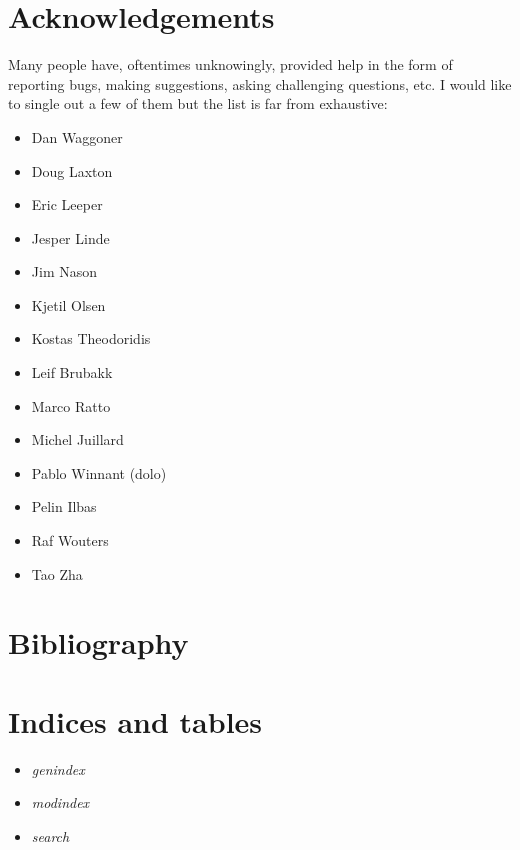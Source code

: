 \documentclass[letterpaper,10pt,english]{sphinxmanual}
\begin{document}
\chapter{Acknowledgements}
\label{acknowledgements:acknowledgements}\label{acknowledgements::doc}
Many people have, oftentimes unknowingly, provided help in the form of reporting bugs, making suggestions, asking challenging questions, etc.
I would like to single out a few of them but the list is far from exhaustive:
\begin{itemize}
\item {} 
Dan Waggoner

\item {} 
Doug Laxton

\item {} 
Eric Leeper

\item {} 
Jesper Linde

\item {} 
Jim Nason

\item {} 
Kjetil Olsen

\item {} 
Kostas Theodoridis

\item {} 
Leif Brubakk

\item {} 
Marco Ratto

\item {} 
Michel Juillard

\item {} 
Pablo Winnant (dolo)

\item {} 
Pelin Ilbas

\item {} 
Raf Wouters

\item {} 
Tao Zha

\end{itemize}


\chapter{Bibliography}
\label{bibliography:bibliography}\label{bibliography::doc}

\chapter{Indices and tables}
\label{master_doc:indices-and-tables}\begin{itemize}
\item {} 
\emph{genindex}

\item {} 
\emph{modindex}

\item {} 
\emph{search}

\end{itemize}



\renewcommand{\indexname}{Index}
\printindex
\end{document}
